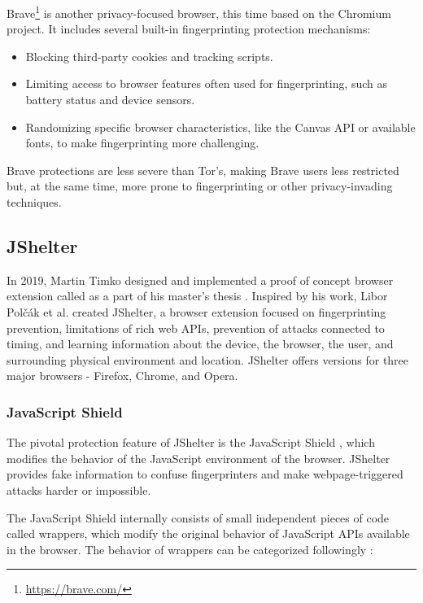 Brave\footnote{\url{https://brave.com/}} is another privacy-focused browser, this time based on the Chromium project. It includes several built-in fingerprinting protection mechanisms:

\begin{itemize}
	\item Blocking third-party cookies and tracking scripts.
	\item Limiting access to browser features often used for fingerprinting, such as battery status and device sensors.
	\item Randomizing specific browser characteristics, like the Canvas API or available fonts, to make fingerprinting more challenging.
\end{itemize}

Brave protections are less severe than Tor's, making Brave users less restricted but, at the same time, more prone to fingerprinting or other privacy-invading techniques.

\subsection{JShelter}

In 2019, Martin Timko designed and implemented a proof of concept browser extension called  as a part of his master's thesis \cite{MatejTimkoDP}. Inspired by his work, Libor Polčák et al. \cite{JShelterPaper} created JShelter, a browser extension focused on fingerprinting prevention, limitations of rich web APIs, prevention of attacks connected to timing, and learning information about the device, the browser, the user, and surrounding physical environment and location. JShelter offers versions for three major browsers - Firefox, Chrome, and Opera.

\subsubsection{JavaScript Shield}

The pivotal protection feature of JShelter is the JavaScript Shield \cite{JShelterJavaScriptShield}, which modifies the behavior of the JavaScript environment of the browser. JShelter provides fake information to confuse fingerprinters and make webpage-triggered attacks harder or impossible.

The JavaScript Shield internally consists of small independent pieces of code called wrappers, which modify the original behavior of JavaScript APIs available in the browser. The behavior of wrappers can be categorized followingly \cite{JShelterJavaScriptShield}:

